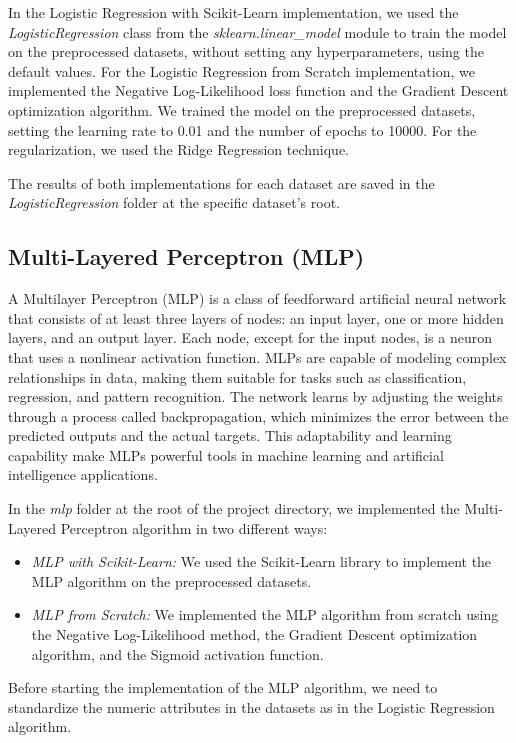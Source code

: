 \documentclass[runningheads]{paper}
\begin{document}
In the Logistic Regression with Scikit-Learn implementation, we used the \textit{LogisticRegression}
class from the \textit{sklearn.linear\_model} module to train the model on the preprocessed
datasets, without setting any hyperparameters, using the default values.
For the Logistic Regression from Scratch implementation, we implemented the Negative Log-Likelihood
loss function and the Gradient Descent optimization algorithm. We trained the model on the
preprocessed datasets, setting the learning rate to 0.01 and the number of epochs to 10000. For the
regularization, we used the Ridge Regression technique.

The results of both implementations for each dataset are saved in the \textit{LogisticRegression}
folder at the specific dataset's root.

\subsection{Multi-Layered Perceptron (MLP)}
A Multilayer Perceptron (MLP) is a class of feedforward artificial neural network 
that consists of at least three layers of nodes: an input layer, one or more 
hidden layers, and an output layer. Each node, except for the input nodes, is a 
neuron that uses a nonlinear activation function. MLPs are capable of modeling 
complex relationships in data, making them suitable for tasks such as 
classification, regression, and pattern recognition. The network learns by 
adjusting the weights through a process called backpropagation, which minimizes 
the error between the predicted outputs and the actual targets. This 
adaptability and learning capability make MLPs powerful tools in machine 
learning and artificial intelligence applications.

In the \textit{mlp} folder at the root of the project directory, we implemented the
Multi-Layered Perceptron algorithm in two different ways:

\begin{itemize}
    \item \textit{MLP with Scikit-Learn:} We used the Scikit-Learn library to implement
    the MLP algorithm on the preprocessed datasets.
    \item \textit{MLP from Scratch:} We implemented the MLP algorithm from scratch using
    the Negative Log-Likelihood method, the Gradient Descent optimization algorithm, and
    the Sigmoid activation function.
\end{itemize}

Before starting the implementation of the MLP algorithm, we need to standardize the
numeric attributes in the datasets as in the Logistic Regression algorithm.
\end{document}
